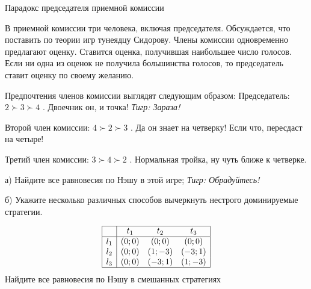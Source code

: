 \begin{problem}
 Парадокс председателя приемной комиссии \par %
В приемной комиссии три человека, включая председателя. Обсуждается, что поставить по теории игр тунеядцу Сидорову. Члены комиссии одновременно предлагают оценку. Ставится оценка, получившая наибольшее число голосов. Если ни одна из оценок не получила большинства голосов, то председатель ставит оценку по своему желанию.\par
Предпочтения членов комиссии выглядят следующим образом:
Председатель:  $2\succ 3\succ 4$ . Двоечник он, и точка! {\it Тигр: Зараза!}\par
Второй член комиссии:  $4\succ 2\succ 3$ . Да он знает на четверку! Если что, пересдаст на четыре!\par
Третий член комиссии:  $3\succ 4\succ 2$ . Нормальная тройка, ну чуть ближе к четверке.\par
а)	Найдите все равновесия по Нэшу в этой игре; {\it Тигр: Обрадуйтесь!}\par
б)	Укажите несколько различных способов вычеркнуть нестрого доминируемые стратегии.



\begin{sol}

\end{sol}
\end{problem}



\begin{problem}

\[\begin{array}{|c|ccc|}  \hline {} & {t_{1} } & {t_{2} } & {t_{3} } \\  \hline {l_{1} } & {\left(0;0\right)} & {\left(0;0\right)} & {\left(0;0\right)} \\ {l_{2} } & {\left(0;0\right)} & {\left(1;-3\right)} & {\left(-3;1\right)} \\ {l_{3} } & {\left(0;0\right)} & {\left(-3;1\right)} & {\left(1;-3\right)} \\  \hline  \end{array}\]
Найдите все равновесия по Нэшу в смешанных стратегиях



\begin{sol}

\end{sol}
\end{problem}



